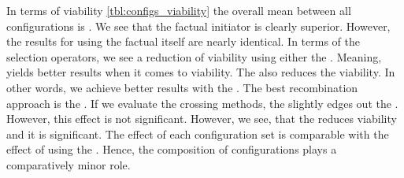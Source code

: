 \documentclass[./../../paper.tex]{subfiles}
\begin{document}
In terms of viability \autoref{tbl:configs_viability} the overall mean between all configurations is . We see that the factual initiator is clearly superior. However, the results for using the factual itself are nearly identical. In terms of the selection operators, we see a reduction of viability using either the . Meaning,  yields better results when it comes to viability. The  also reduces the viability. In other words, we achieve better results with the . The best recombination approach is the . If we evaluate the crossing methods, the  slightly edges out the . However, this effect is not significant. However, we see, that the  reduces viability and it is significant. The effect of each configuration set is comparable with the effect of using the . Hence, the composition of configurations plays a comparatively minor role.
\end{document}
